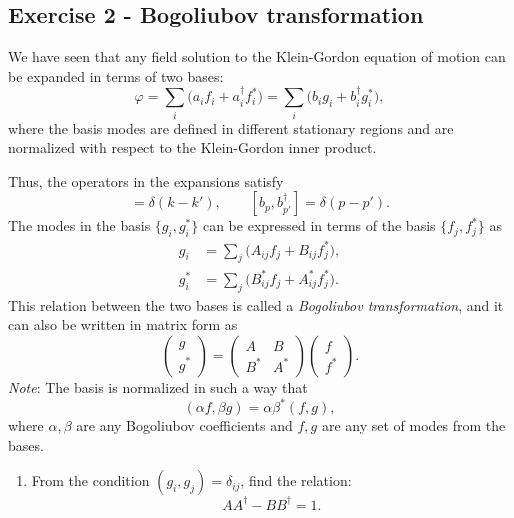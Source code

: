 \documentclass[10pt,a4paper]{article}
\theoremstyle{definition}
\begin{document}
\subsection*{Exercise 2 - Bogoliubov transformation}
{\color{blue}
We have seen that any field solution to the Klein-Gordon equation of motion can be expanded in terms of two bases:
\begin{equation}
\varphi = \sum_i \bigl( a_i f_i + a_i^\dagger f_i^* \bigr) = \sum_i \bigl( b_i g_i + b_i^\dagger g_i^* \bigr), 
\tag{2.1}
\end{equation}
where the basis modes are defined in different stationary regions and are normalized with respect to the Klein-Gordon inner product.  

Thus, the operators in the expansions satisfy
\begin{equation}
[ a_k, a_{k'}^\dagger ] = \delta(k - k'), 
\qquad
[ b_p, b_{p'}^\dagger ] = \delta(p - p').
\tag{2.2}
\end{equation}
The modes in the basis $\{g_i, g_i^*\}$ can be expressed in terms of the basis $\{f_j, f_j^*\}$ as
\begin{align}
g_i &= \sum_j \bigl( A_{ij} f_j + B_{ij} f_j^* \bigr), 
\tag{2.3}
\\
g_i^* &= \sum_j \bigl( B^*_{ij} f_j + A^*_{ij} f_j^* \bigr).
\tag{2.4}
\end{align}
This relation between the two bases is called a \emph{Bogoliubov transformation}, and it can also be written in matrix form as
\begin{equation}
\begin{pmatrix}
g \\
g^*
\end{pmatrix}
=
\begin{pmatrix}
A & B \\
B^* & A^*
\end{pmatrix}
\begin{pmatrix}
f \\
f^*
\end{pmatrix}.
\tag{2.5}
\end{equation}
\textit{Note}: The basis is normalized in such a way that
\[
(\alpha f, \beta g) = \alpha \beta^* (f, g),
\]
where $\alpha, \beta$ are any Bogoliubov coefficients and $f,g$ are any set of modes from the bases.

\begin{enumerate}
\item From the condition $(g_i, g_j) = \delta_{ij}$, find the relation:
\begin{equation}
A A^\dagger - B B^\dagger = 1.  \tag{2.6}
\end{equation}
    

\end{enumerate}}
\end{document}
